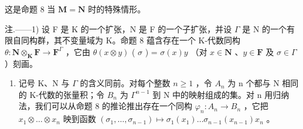 这是命题 8 当 \(\mathbf{M} = \mathbf{N}\) 时的特殊情形。

注.——1) 设 F 是 K 的一个扩张，N 是 F 的一个子扩张，并设 \(\Gamma\) 是 N 的一个有限自同构群，其不变量域为 K。命题 8 蕴含存在一个 K-代数同构 \(\theta: \mathbf{N} \otimes_{\mathbf{K}} \mathbf{F} \to \mathbf{F}^{\Gamma}\) ，它由 \(\theta(x \otimes y)\) ( \(\sigma\) ) = \(\sigma(x)y\) （对 \(x \in \mathbf{N}\) 、\(y \in \mathbf{F}\) 及 \(\sigma \in \Gamma\) ）刻画。

\begin{enumerate}
\def\labelenumi{\arabic{enumi})}
\setcounter{enumi}{1}
\tightlist
\item
  记号 K、N 与 \(\Gamma\) 的含义同前。对每个整数 \(n \geqslant 1\) ，令 \(A_{n}\) 为 n 个都与 N 相同的 K-代数的张量积；令 \(B_{n}\) 为 \(\Gamma^{n-1}\) 到 N 中的映射组成的集。对 n 用归纳法，我们可以从命题 8 的推论推出存在一个同构 \(\varphi_{n}: A_{n} \to B_{n}\) ，它把 \(x_{1} \otimes \ldots \otimes x_{n}\) 映到函数 \((\sigma_{1}, \ldots, \sigma_{n-1}) \mapsto \sigma_{1}(x_{1}) \ldots \sigma_{n-1}(x_{n-1}) x_{n}\) 。
\end{enumerate}

